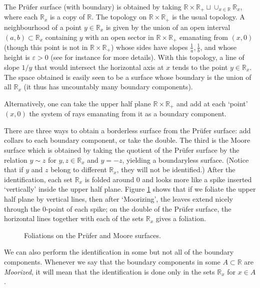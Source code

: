 \documentclass{amsart}
\begin{document}
\smallskip
The Pr\"ufer surface (with boundary) is obtained by taking  ${\mathbb R}\times{\mathbb R}_+\sqcup \cup_{x\in{\mathbb R}}{\mathbb R}_x$, where each ${\mathbb R}_x$ is a copy of ${\mathbb R}$. The topology on ${\mathbb R}\times{\mathbb R}_+$ is the usual topology. A  neighbourhood of a point $y\in{\mathbb R}_x$ is given by the union of an open interval $(a,b)\subset{\mathbb R}_x$ containing $y$ with an open sector in ${\mathbb R}\times{\mathbb R}_+$ emanating from $(x,0)$ (though this point is not in ${\mathbb R}\times{\mathbb R}_+$) whose sides have slopes $\frac{1}{a}, \frac{1}{b}$, and whose height is $\varepsilon > 0$ (see for instance \cite[Section~2]{BGG1} for more details).  With this topology, a line of slope $1/y$ that would intersect the horizontal axis at $x$ tends to the point $y\in{\mathbb R}_x$. The space obtained is easily seen to be a surface whose boundary is the union of all ${\mathbb R}_x$ (it thus has uncountably many boundary components).

Alternatively, one can take the upper half plane ${\mathbb R}\times{\mathbb R}_+$ and add at each `point' $(x,0)$ the system of rays emanating from it as a boundary component.  

There are three ways to obtain a borderless surface from the Pr\"ufer surface: add collars to each boundary component, or take the double. The third is the Moore surface which is obtained by taking the quotient of the Pr\"ufer surface by the relation $y\sim z$ for $y,z\in{\mathbb R}_x$ and $y=-z$, yielding a boundaryless surface. (Notice that if $y$ and $z$ belong to different ${\mathbb R}_x$, they will not be identified.) After the identification, each set ${\mathbb R}_x$ is folded around $0$ and looks more like a spike inserted `vertically' inside the upper half plane. Figure \ref{figPM} shows that if we foliate the upper half plane by vertical lines, then after `Moorizing', the leaves extend nicely through the $0$-point of each spike;
on the double of the Pr\"ufer surface, the horizontal lines together with each of the sets ${\mathbb R}_x$ gives a foliation. 

\begin{figure}[h]
\centering
    \caption{\label{figPM} Foliations on the Pr\"ufer and Moore surfaces.}
\end{figure}

We can also perform the identification in some but not all of the boundary components. Whenever we say that the boundary components in some $A\subset{\mathbb R}$ are {\em Moorized}, it will mean that the identification is done only in the sets ${\mathbb R}_x$ for $x\in A$.
\end{document}
